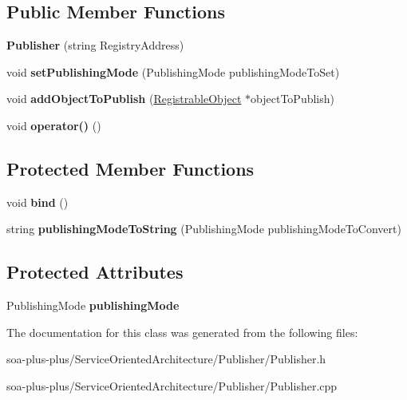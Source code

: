 \subsection*{Public Member Functions}
\begin{DoxyCompactItemize}
\item 
\hypertarget{class_publisher_a0b4b73f8fabab27b1a522414bc01f3de}{
{\bfseries Publisher} (string RegistryAddress)}
\label{class_publisher_a0b4b73f8fabab27b1a522414bc01f3de}

\item 
\hypertarget{class_publisher_a9f059875d59f0f40dc097142fbfa8450}{
void {\bfseries setPublishingMode} (PublishingMode publishingModeToSet)}
\label{class_publisher_a9f059875d59f0f40dc097142fbfa8450}

\item 
\hypertarget{class_publisher_aab8d87a3185375b398873b45647e4be2}{
void {\bfseries addObjectToPublish} (\hyperlink{class_registrable_object}{RegistrableObject} $\ast$objectToPublish)}
\label{class_publisher_aab8d87a3185375b398873b45647e4be2}

\item 
\hypertarget{class_publisher_af67d54ec9b32cc80e506b3ed1f2bb670}{
void {\bfseries operator()} ()}
\label{class_publisher_af67d54ec9b32cc80e506b3ed1f2bb670}

\end{DoxyCompactItemize}
\subsection*{Protected Member Functions}
\begin{DoxyCompactItemize}
\item 
\hypertarget{class_publisher_a585eb4f0833adf2d57ee35aff43887f8}{
void {\bfseries bind} ()}
\label{class_publisher_a585eb4f0833adf2d57ee35aff43887f8}

\item 
\hypertarget{class_publisher_ae019dccb5c700521d213fb566f45b4c9}{
string {\bfseries publishingModeToString} (PublishingMode publishingModeToConvert)}
\label{class_publisher_ae019dccb5c700521d213fb566f45b4c9}

\end{DoxyCompactItemize}
\subsection*{Protected Attributes}
\begin{DoxyCompactItemize}
\item 
\hypertarget{class_publisher_ada96264c1750b30f5993356de0f88306}{
PublishingMode {\bfseries publishingMode}}
\label{class_publisher_ada96264c1750b30f5993356de0f88306}

\end{DoxyCompactItemize}


The documentation for this class was generated from the following files:\begin{DoxyCompactItemize}
\item 
soa-\/plus-\/plus/ServiceOrientedArchitecture/Publisher/Publisher.h\item 
soa-\/plus-\/plus/ServiceOrientedArchitecture/Publisher/Publisher.cpp\end{DoxyCompactItemize}
